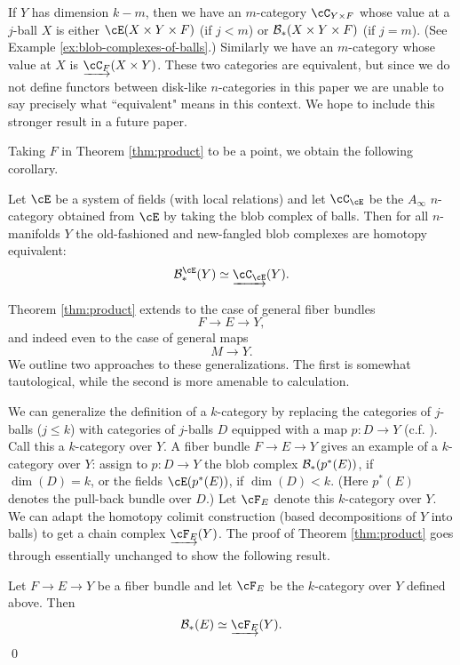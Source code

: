 
If $Y$ has dimension $k-m$, then we have an $m$-category $\cC_{Y\times F}$ whose value at
a $j$-ball $X$ is either $\cE(X\times Y\times F)$ (if $j<m$) or ${\mathcal B}_*(X\times Y\times F)$
(if $j=m$).
(See Example \ref{ex:blob-complexes-of-balls}.)
Similarly we have an $m$-category whose value at $X$ is $\cl{\cC_F}(X\times Y)$.
These two categories are equivalent, but since we do not define functors between
disk-like $n$-categories in this paper we are unable to say precisely
what ``equivalent" means in this context.
We hope to include this stronger result in a future paper.

\medskip

Taking $F$ in Theorem \ref{thm:product} to be a point, we obtain the following corollary.

\begin{cor}
\label{cor:new-old}
Let $\cE$ be a system of fields (with local relations) and let $\cC_\cE$ be the $A_\infty$
$n$-category obtained from $\cE$ by taking the blob complex of balls.
Then for all $n$-manifolds $Y$ the old-fashioned and new-fangled blob complexes are
homotopy equivalent:
\[
	\bc^\cE_*(Y) \htpy \cl{\cC_\cE}(Y) .
\]
\end{cor}

\medskip

Theorem \ref{thm:product} extends to the case of general fiber bundles
\[
	F \to E \to Y ,
\]
and indeed even to the case of general maps
\[
	M\to Y .
\]
We outline two approaches to these generalizations.
The first is somewhat tautological, while the second is more amenable to
calculation.

We can generalize the definition of a $k$-category by replacing the categories
of $j$-balls ($j\le k$) with categories of $j$-balls $D$ equipped with a map $p:D\to Y$
(c.f. \cite{MR2079378}).
Call this a $k$-category over $Y$.
A fiber bundle $F\to E\to Y$ gives an example of a $k$-category over $Y$:
assign to $p:D\to Y$ the blob complex ${\mathcal B}_*(p^*(E))$, if $\dim(D) = k$,
or the fields $\cE(p^*(E))$, if $\dim(D) < k$.
(Here $p^*(E)$ denotes the pull-back bundle over $D$.)
Let $\cF_E$ denote this $k$-category over $Y$.
We can adapt the homotopy colimit construction (based decompositions of $Y$ into balls) to
get a chain complex $\cl{\cF_E}(Y)$.
The proof of Theorem \ref{thm:product} goes through essentially unchanged 
to show the following result.
\begin{thm}
Let $F \to E \to Y$ be a fiber bundle and let $\cF_E$ be the $k$-category over $Y$ defined above.
Then
\[
	\bc_*(E) \simeq \cl{\cF_E}(Y) .
\]
\qed
\end{thm}

